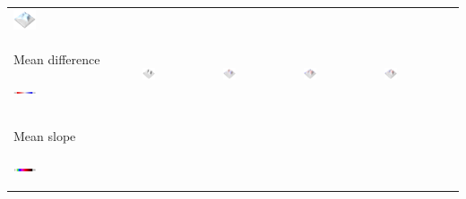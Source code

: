 \documentclass[prodmode,acmtochi]{acmsmall} %
\begin{document}
\begin{table}
{\begin{tabular}{m{} m{} m{} m{} m{}}
\includegraphics[width=0.19\textwidth]{images/render_3d/participants/stdev_regression_difference_series_3.png}\\
%
Mean difference \par \vspace{0.5em} \includegraphics[width=0.19\textwidth]{images/legends/diff_legend.pdf} & 
\includegraphics[width=0.19\textwidth]{images/render_3d/participants/dem_difference_1.png} &
\includegraphics[width=0.19\textwidth]{images/render_3d/participants/mean_dem_regression_difference_1.png} &
\includegraphics[width=0.19\textwidth]{images/render_3d/participants/mean_dem_regression_difference_2.png} &
\includegraphics[width=0.19\textwidth]{images/render_3d/participants/mean_dem_regression_difference_3.png}\\
%
Mean slope \par \vspace{0.5em} \includegraphics[width=0.19\textwidth]{images/legends/slope_legend.pdf} & 

\end{tabular}}
\end{table}
\end{document}
